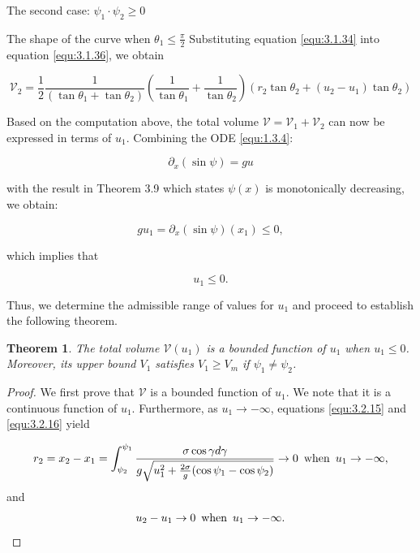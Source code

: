 \documentclass[letterpaper,reqno,10pt,twoside]{amsart}
\newtheorem{theorem}{Theorem}[section]
\theoremstyle{definition}
\theoremstyle{remark}
\begin{document}
\begin{section}{The second case: $\psi_1\cdot \psi_2\geq 0$ }
\begin{subsection}{The shape of the curve when $\theta_1\leq \frac{\pi}{2}$}
        \noindent  Substituting equation \eqref{equ:3.1.34} into equation \eqref{equ:3.1.36}, we obtain

        \begin{equation*}
            {\mathscr{V}}_2=\frac{1}{2}\frac{1}{(\tan\theta_1+\tan\theta_2)}(\frac{1}{\tan\theta_1}+\frac{1}{\tan\theta_2})(r_2\tan\theta_2+(u_2-u_1)\tan\theta_2)
        \end{equation*}

         Based on the computation above,  the total volume ${\mathscr{V}}={\mathscr{V}}_1+{\mathscr{V}}_2$ can now be expressed in terms of $u_1$. Combining the ODE \eqref{equ:1.3.4}:

        \begin{equation*}
            \partial_{x}(\sin\psi)=gu
        \end{equation*}

        \noindent with the result in Theorem 3.9 which states $\psi(x)$ is monotonically decreasing, we obtain:

        \begin{equation*}
            gu_1=\partial_{x}(\sin\psi)(x_1)\leq 0,
        \end{equation*}

        \noindent which implies that

        \begin{equation*}
            u_1\leq 0.
        \end{equation*}

        \noindent Thus, we determine the admissible range of values for $u_1$
       and proceed to establish the following theorem.
        
        \begin{theorem}

            The total volume ${\mathscr{V}}(u_1)$ is a bounded function of $u_1$ when $u_1\leq 0$. Moreover, its upper bound $V_{1}$ satisfies $V_1\geq V_{m}$ if $\psi_{1}\neq \psi_{2}$.
        \end{theorem}
        \begin{proof}
        
            We first prove that $\mathscr{V}$ is a bounded function of $u_1$. We note that it is a continuous function of $u_1$. Furthermore, as $u_1\rightarrow -\infty$, equations \eqref{equ:3.2.15} and \eqref{equ:3.2.16} yield

            \begin{equation}{\label{equ:3.1.37}}
                r_2=x_2-x_1=\int_{\psi_2}^{\psi_1}\frac{\sigma\cos\gamma d\gamma}{g\sqrt{u_1^{2}+\frac{2\sigma}{g}(\cos\psi_1-\cos\psi_2)}}\rightarrow 0~\operatorname{when}~u_1\rightarrow -\infty,
            \end{equation}
            and
            \begin{equation}{\label{equ:3.1.38}}
                u_2-u_1\rightarrow 0~\operatorname{when}~u_1\rightarrow -\infty.
            \end{equation}


\end{proof}
\end{subsection}
\end{section}
\end{document}
